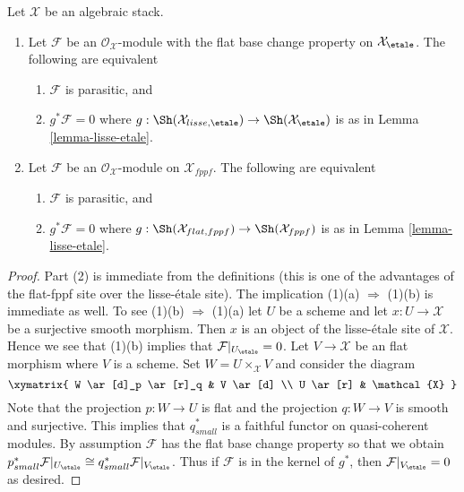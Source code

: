 \begin{lemma}
\label{lemma-parasitic-in-terms-flat-fppf}
Let $\mathcal{X}$ be an algebraic stack.
\begin{enumerate}
\item Let $\mathcal{F}$ be an $\mathcal{O}_\mathcal{X}$-module
with the flat base change property on $\mathcal{X}_\etale$.
The following are equivalent
\begin{enumerate}
\item $\mathcal{F}$ is parasitic, and
\item $g^*\mathcal{F} = 0$ where
$g : \Sh(\mathcal{X}_{lisse,\etale}) \to
\Sh(\mathcal{X}_\etale)$ is as in Lemma \ref{lemma-lisse-etale}.
\end{enumerate}
\item Let $\mathcal{F}$ be an $\mathcal{O}_\mathcal{X}$-module on
$\mathcal{X}_{fppf}$. The following are equivalent
\begin{enumerate}
\item $\mathcal{F}$ is parasitic, and
\item $g^*\mathcal{F} = 0$ where
$g :  \Sh(\mathcal{X}_{flat,fppf}) \to \Sh(\mathcal{X}_{fppf})$
is as in Lemma \ref{lemma-lisse-etale}.
\end{enumerate}
\end{enumerate}
\end{lemma}

\begin{proof}
Part (2) is immediate from the definitions (this is one of the advantages
of the flat-fppf site over the lisse-\'etale site). The implication
(1)(a) $\Rightarrow$ (1)(b) is immediate as well. To see (1)(b)
$\Rightarrow$ (1)(a) let $U$ be a scheme and let $x : U \to \mathcal{X}$
be a surjective smooth morphism. Then $x$ is an object of the
lisse-\'etale site of $\mathcal{X}$. Hence we see that (1)(b)
implies that $\mathcal{F}|_{U_\etale} = 0$. Let $V \to \mathcal{X}$
be an flat morphism where $V$ is a scheme. Set $W = U \times_\mathcal{X} V$
and consider the diagram
$$
\xymatrix{
W \ar[d]_p \ar[r]_q & V \ar[d] \\
U \ar[r] & \mathcal{X}
}
$$
Note that the projection $p : W \to U$ is flat and the projection
$q : W \to V$ is smooth and surjective. This implies that $q_{small}^*$
is a faithful functor on quasi-coherent modules. By assumption $\mathcal{F}$
has the flat base change property so that we obtain
$p_{small}^*\mathcal{F}|_{U_\etale} \cong
q_{small}^*\mathcal{F}|_{V_\etale}$. Thus if $\mathcal{F}$
is in the kernel of $g^*$, then $\mathcal{F}|_{V_\etale} = 0$
as desired.
\end{proof}






